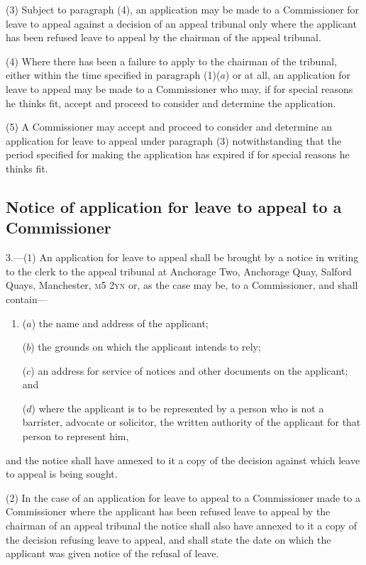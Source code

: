 \documentclass[12pt,a4paper]{article}
\begin{document}
(3) Subject to paragraph (4), an application may be made to a Commissioner for leave to appeal against a decision of an appeal tribunal only where the applicant has been refused leave to appeal by the chairman of the appeal tribunal.

(4) Where there has been a failure to apply to the chairman of the tribunal, either within the time specified in paragraph (1)($a$) or at all, an application for leave to appeal may be made to a Commissioner who may, if for special reasons he thinks fit, accept and proceed to consider and determine the application.

(5) A Commissioner may accept and proceed to consider and determine an application for leave to appeal under paragraph (3) notwithstanding that the period specified for making the application has expired if for special reasons he thinks fit.

\subsection[3. Notice of application for leave to appeal to a Commissioner]{Notice of application for leave to appeal to a Commissioner}

3.—(1) An application for leave to appeal shall be brought by a notice in writing to the clerk to the 
appeal tribunal  %
at Anchorage Two, Anchorage Quay, Salford Quays, Manchester, \textsc{\lowercase{M5 2YN}} or, as the case may be, to a Commissioner, and shall contain—
\begin{enumerate}\item[]
($a$) the name and address of the applicant;

($b$) the grounds on which the applicant intends to rely;

($c$) an address for service of notices and other documents on the applicant; and

($d$) where the applicant is to be represented by a person who is not a barrister, advocate or solicitor, the written authority of the applicant for that person to represent him,
\end{enumerate}
and the notice shall have annexed to it a copy of the decision against which leave to appeal is being sought.

(2) In the case of an application for leave to appeal to a Commissioner made to a Commissioner where the applicant has been refused leave to appeal by the chairman of an appeal tribunal the notice shall also have annexed to it a copy of the decision refusing leave to appeal, and shall state the date on which the applicant was given notice of the refusal of leave.
\end{document}
